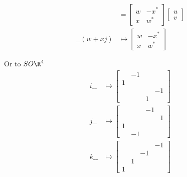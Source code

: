 \documentclass[draft]{scrartcl}
\newcommand{\SO}{SO}
\renewcommand{\blank}{\_\_}
\begin{document}
\begin{multicols*}{2}
\begin{align*}
    &=
    \begin{bmatrix}
      w & -x^* \\
      x & w^*
    \end{bmatrix}
    \begin{bmatrix}
      u\\ v
    \end{bmatrix}
    \\
    \blank(w+xj) &\mapsto
                   \begin{bmatrix}
                     w & -x^* \\ x & w^*
                   \end{bmatrix}
  \end{align*}

  Or to \(\SO\R^4\)
  \begin{align*}
    i\blank&\mapsto
       \begin{bmatrix}
          & -1\\
         1 \\
          & & & -1\\
          & & 1
       \end{bmatrix} \\
    j\blank & \mapsto
              \begin{bmatrix}
                && -1\\
                &&    &1\\
                1         \\
                & -1
              \end{bmatrix} \\
    k \blank & \mapsto
               \begin{bmatrix}
                 &  &  &-1\\
                 &  &-1\\
                 & 1\\
                 1
               \end{bmatrix} \\
  \end{align*}


\end{multicols*}
\end{document}
